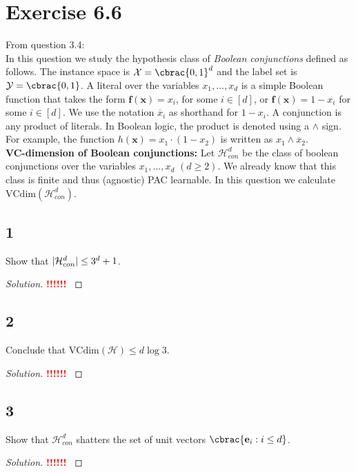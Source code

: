 \documentclass[10pt, a4paper, twoside]{amsart}
\DeclarePairedDelimiter\abs{\lvert}{\rvert}
\DeclarePairedDelimiter\cbrac\{\}
\newcommand{\cH}{\ensuremath{\mathcal{H}}}
\newcommand{\cX}{\ensuremath{\mathcal{X}}}
\newenvironment{solution}
               {\let\oldqedsymbol=\qedsymbol
                \renewcommand{\qedsymbol}{$\blacktriangleleft$}
                \begin{proof}[Solution]}
               {\end{proof}
                \renewcommand{\qedsymbol}{\oldqedsymbol}}
\newcommand{\TODO}{\textcolor{red}{\textbf{!!!!!! }}}
\begin{document}
\section*{Exercise 6.6}
From question 3.4: \\
In this question we study the hypothesis class of \textit{Boolean conjunctions} defined as follows. The instance space is $\cX = \cbrac{0,1}^d$ and the label set is $\mathcal{Y}=\cbrac{0,1}$. A literal over the variables $x_1, \ldots ,x_d$ is a simple Boolean function that takes the form $\mathbf{f}(\mathbf{x}) = x_i$, for some $i \in [d]$, or $\mathbf{f}(\mathbf{x}) = 1-x_i$ for some $i \in [d]$. We use the notation $\overline{x}_i$ as shorthand for $1-x_i$. A conjunction is any product of literals. In Boolean logic, the product is denoted using a $\land$ sign. For example, the function $h(\mathbf{x}) = x_1 \cdot (1-x_2)$ is written as $x_1 \land \overline{x}_2$.\\
\textbf{VC-dimension of Boolean conjunctions:} Let $\cH^d_{con}$ be the class of boolean conjunctions over the variables $x_1, \ldots , x_d$ $(d \geq 2)$. We already know that this class is finite and thus (agnostic) PAC learnable. In this question we calculate $\text{VCdim}(\cH^d_{con})$.
\subsection*{1}
Show that $\abs{\cH^d_{con}} \leq 3^d + 1$.
\begin{solution}
\TODO
\end{solution}
\subsection*{2}
Conclude that $\text{VCdim}(\cH) \leq d \log 3$.
\begin{solution}
\TODO
\end{solution}
\subsection*{3}
Show that $\cH^d_{con}$ shatters the set of unit vectors $\cbrac{\mathbf{e}_i:i \leq d}$.
\begin{solution}
\TODO
\end{solution}
\end{document}
